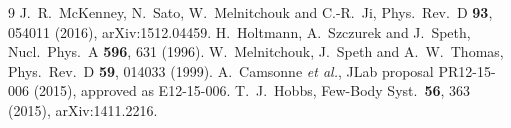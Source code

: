 \documentclass[11pt,a4paper]{article}
\begin{document}
\begin{thebibliography}{9}
 J.~R.~McKenney, N.~Sato, W.~Melnitchouk and C.-R.~Ji,
  Phys.\ Rev.\ D \textbf{93}, 054011 (2016), arXiv:1512.04459.
 H.~Holtmann, A.~Szczurek and J.~Speth,
  Nucl.\ Phys.\ A \textbf{596}, 631 (1996).
 W.~Melnitchouk, J.~Speth and A.~W.~Thomas,
  Phys.\ Rev.\ D \textbf{59}, 014033 (1999).
 A.~Camsonne \textit{et al.}, JLab proposal PR12-15-006 (2015),
  approved as E12-15-006.
 T.~J.~Hobbs, Few-Body Syst.\ \textbf{56}, 363 (2015),
  arXiv:1411.2216.
\end{thebibliography}
\end{document}
